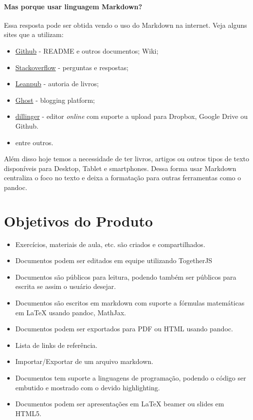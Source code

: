 \paragraph{Mas porque usar linguagem Markdown?}

Essa resposta pode ser obtida vendo o uso do Markdown na internet. Veja
alguns sites que a utilizam:

\begin{itemize}
\item
  \href{http://github.com}{Github} - README e outros documentos; Wiki;
\item
  \href{http://stackoverflow.com/}{Stackoverflow} - perguntas e
  respostas;
\item
  \href{https://leanpub.com/authors\#how\_leanpub\_works}{Leanpub} -
  autoria de livros;
\item
  \href{https://ghost.org/}{Ghost} - blogging platform;
\item
  \href{https://github.com/joemccann/dillinger}{dillinger} - editor
  \emph{online} com suporte a upload para Dropbox, Google Drive ou
  Github.
\item
  entre outros.
\end{itemize}
Além disso hoje temos a necessidade de ter livros, artigos ou outros
tipos de texto disponíveis para Desktop, Tablet e smartphones. Dessa
forma usar Markdown centraliza o foco no texto e deixa a formatação para
outras ferramentas como o pandoc.

\section{Objetivos do Produto}

\begin{itemize}
\item
  Exercícios, materiais de aula, etc. são criados e compartilhados.
\item
  Documentos podem ser editados em equipe utilizando TogetherJS
\item
  Documentos são públicos para leitura, podendo também ser públicos para
  escrita se assim o usuário desejar.
\item
  Documentos são escritos em markdown com suporte a fórmulas matemáticas
  em LaTeX usando pandoc, MathJax.
\item
  Documentos podem ser exportados para PDF ou HTML usando pandoc.
\item
  Lista de links de referência.
\item
  Importar/Exportar de um arquivo markdown.
\item
  Documentos tem suporte a linguagens de programação, podendo o código
  ser embutido e mostrado com o devido highlighting.
\item
  Documentos podem ser apresentações em LaTeX beamer ou slides em HTML5.
\end{itemize}
